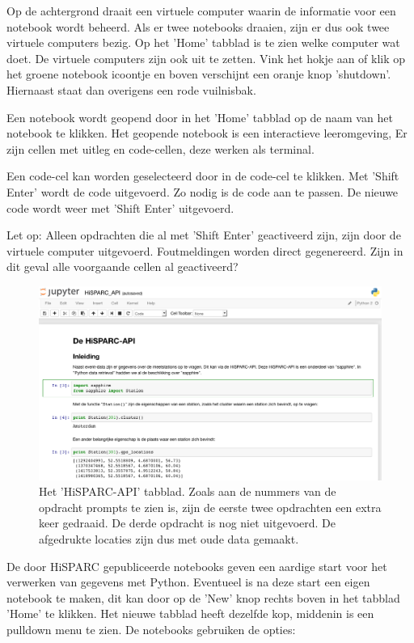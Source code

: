 Op de achtergrond draait een virtuele computer waarin de informatie voor 
een notebook wordt beheerd. Als er twee notebooks draaien, zijn er dus ook twee virtuele computers bezig. Op het 
'Home' tabblad is te zien welke computer wat doet. De virtuele computers zijn ook uit te zetten. Vink het hokje aan of 
klik op het groene notebook icoontje en boven verschijnt een oranje knop 'shutdown'. Hiernaast staat dan overigens 
een rode vuilnisbak.

Een notebook wordt geopend door in het 'Home' tabblad op de naam van het notebook te klikken. Het geopende notebook 
is een interactieve leeromgeving, Er zijn cellen met uitleg en code-cellen, deze werken als terminal.

Een code-cel kan worden geselecteerd door in de code-cel te klikken. Met 'Shift Enter' wordt de code uitgevoerd. Zo nodig 
is de code aan te passen. De nieuwe code wordt weer met 'Shift Enter' uitgevoerd.

Let op: Alleen opdrachten die al met 'Shift Enter' geactiveerd zijn, zijn door de virtuele computer uitgevoerd. Foutmeldingen 
worden direct gegenereerd. Zijn in dit geval alle voorgaande cellen al geactiveerd?

\begin{figure}[H]
\includegraphics[width=16cm]{HiSPARC_API.png}
\caption{Het 'HiSPARC-API' tabblad. Zoals aan de nummers van de opdracht prompts te zien is, zijn de eerste twee opdrachten 
een extra keer gedraaid. De derde opdracht is nog niet uitgevoerd. De afgedrukte locaties zijn dus met oude data gemaakt.}
\end{figure}

De door HiSPARC gepubliceerde notebooks geven een aardige start voor het verwerken van gegevens met Python. 
Eventueel is na deze start een eigen notebook te maken, dit kan door op de 'New' knop rechts boven in het tabblad 'Home' te 
klikken. Het nieuwe tabblad heeft dezelfde kop, middenin is een pulldown menu te zien. De notebooks gebruiken de opties:
 
